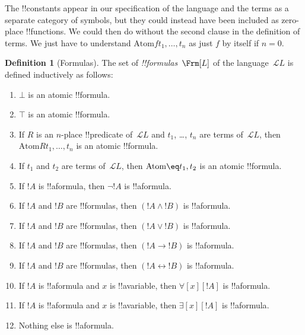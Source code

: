 \documentclass[10pt,a4paper]{article}
\theoremstyle{plain}
\theoremstyle{definition}
\newtheorem{defn}[thm]{Definition}
\theoremstyle{remark}
\newenvironment{explain}{}{}
\newcommand*{\ollabel}[1]{\label{#1}}
\providecommand{\lif}{\mathbin{\rightarrow}}
\providecommand{\lforall}{\mathord{\forall}}
\providecommand{\lexists}{\mathord{\exists}}
\providecommand{\ltrue}{\top}
\providecommand{\lfalse}{\bot}
\providecommand{\Lang}{\ensuremath{\mathcal{L}}}
\providecommand{\tagitem}[1]{\item[#1]}
\providecommand{\liff}{\mathbin{\leftrightarrow}}
\providecommand{\Atom}{\mathrm{Atom}}
\begin{document}
\begin{explain}
The !!{constant}s appear in our specification of the language and the
terms as a separate category of symbols, but they could instead have
been included as zero-place !!{function}s.  We could then do without
the second clause in the definition of terms. We just have to
understand $\Atom{f}{t_1, \ldots, t_n}$ as just $f$ by itself if $n =
0$.
\end{explain}

\begin{defn}[Formulas]
\ollabel{defn:formulas}
The set of \emph{!!{formula}s}~$\Frm[L]$ of the language~$\Lang L$
is defined inductively as follows:
\begin{enumerate}
\tagitem{prvFalse}{$\lfalse$ is an atomic !!{formula}.}{}

\tagitem{prvTrue}{$\ltrue$ is an atomic !!{formula}.}{}

\item If $R$ is an $n$-place !!{predicate} of~$\Lang L$ and $t_1$, \dots,
  $t_n$ are terms of~$\Lang L$, then $\Atom{R}{t_1,\ldots, t_n}$ is an
  atomic !!{formula}.

\item If $t_1$ and $t_2$ are terms of~$\Lang L$, then $\Atom{\eq}{t_1, t_2}$
  is an atomic !!{formula}.

\tagitem{prvNot}{If $!A$ is !!a{formula}, then $\lnot !A$ is
  !!a{formula}.}{}

\tagitem{prvAnd}{If $!A$ and $!B$ are !!{formula}s, then $(!A \land
  !B)$ is !!a{formula}.}{}

\tagitem{prvOr}{If $!A$ and $!B$ are !!{formula}s, then $(!A \lor !B)$
  is !!a{formula}.}{}

\tagitem{prvIf}{If $!A$ and $!B$ are !!{formula}s, then $(!A \lif !B)$
  is !!a{formula}.}{}

\tagitem{prvIff}{If $!A$ and $!B$ are !!{formula}s, then $(!A \liff !B)$
  is !!a{formula}.}{}

\tagitem{prvAll}{If $!A$ is !!a{formula} and $x$ is !!a{variable},
  then $\lforall[x][!A]$ is !!a{formula}.}{}

\tagitem{prvEx}{If $!A$ is !!a{formula} and $x$ is !!a{variable},
  then $\lexists[x][!A]$ is !!a{formula}.}{}

\tagitem{limitClause}{Nothing else is !!a{formula}.}{}
\end{enumerate}
\end{defn}
\end{document}
